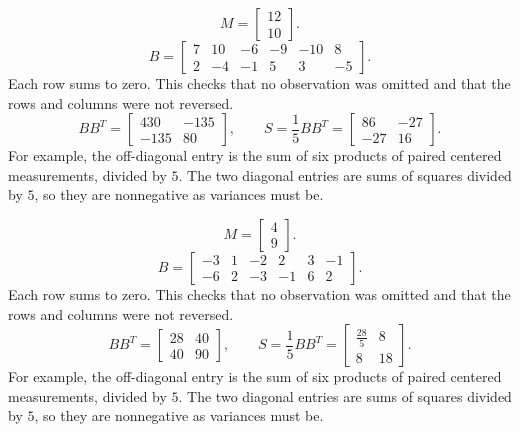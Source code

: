 \[M=\begin{bmatrix}12\\10\end{bmatrix}.\]
\[B=\begin{bmatrix}7&10&-6&-9&-10&8\\2&-4&-1&5&3&-5\end{bmatrix}.\]
Each row sums to zero. This checks that no observation was omitted and that the rows and columns were not reversed.
\[BB^T=\begin{bmatrix}430&-135\\-135&80\end{bmatrix},\qquad S=\frac15BB^T=\begin{bmatrix}86&-27\\-27&16\end{bmatrix}.\]
For example, the off-diagonal entry is the sum of six products of paired centered measurements, divided by $5$. The two diagonal entries are sums of squares divided by $5$, so they are nonnegative as variances must be.

\[M=\begin{bmatrix}4\\9\end{bmatrix}.\]
\[B=\begin{bmatrix}-3&1&-2&2&3&-1\\-6&2&-3&-1&6&2\end{bmatrix}.\]
Each row sums to zero. This checks that no observation was omitted and that the rows and columns were not reversed.
\[BB^T=\begin{bmatrix}28&40\\40&90\end{bmatrix},\qquad S=\frac15BB^T=\begin{bmatrix}\frac{28}{5}&8\\8&18\end{bmatrix}.\]
For example, the off-diagonal entry is the sum of six products of paired centered measurements, divided by $5$. The two diagonal entries are sums of squares divided by $5$, so they are nonnegative as variances must be.

